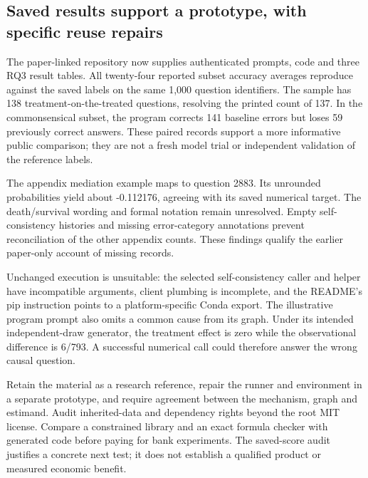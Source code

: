 \hypertarget{saved-results-support-a-prototype-with-specific-reuse-repairs}{%
\subsection{Saved results support a prototype, with specific reuse
repairs}\label{saved-results-support-a-prototype-with-specific-reuse-repairs}}

The paper-linked repository now supplies authenticated prompts, code and
three RQ3 result tables. All twenty-four reported subset accuracy
averages reproduce against the saved labels on the same 1,000 question
identifiers. The sample has 138 treatment-on-the-treated questions,
resolving the printed count of 137. In the commonsensical subset, the
program corrects 141 baseline errors but loses 59 previously correct
answers. These paired records support a more informative public
comparison; they are not a fresh model trial or independent validation
of the reference
labels.\citep{exec21_prophets_repo,exec21_prophets_repo_reference}

The appendix mediation example maps to question 2883. Its unrounded
probabilities yield about -0.112176, agreeing with its saved numerical
target. The death/survival wording and formal notation remain
unresolved. Empty self-consistency histories and missing error-category
annotations prevent reconciliation of the other appendix counts. These
findings qualify the earlier paper-only account of missing
records.\citep{exec21_prophets_repo_reference}

Unchanged execution is unsuitable: the selected self-consistency caller
and helper have incompatible arguments, client plumbing is incomplete,
and the README's pip instruction points to a platform-specific Conda
export. The illustrative program prompt also omits a common cause from
its graph. Under its intended independent-draw generator, the treatment
effect is zero while the observational difference is 6/793. A successful
numerical call could therefore answer the wrong causal
question.\citep{exec21_prophets_repo,exec21_prophets_repo_reference}

Retain the material as a research reference, repair the runner and
environment in a separate prototype, and require agreement between the
mechanism, graph and estimand. Audit inherited-data and dependency
rights beyond the root MIT license. Compare a constrained library and an
exact formula checker with generated code before paying for bank
experiments. The saved-score audit justifies a concrete next test; it
does not establish a qualified product or measured economic benefit.


